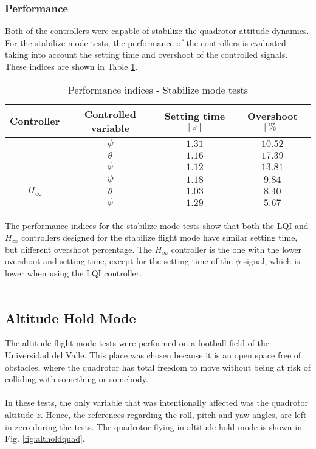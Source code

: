 \subsubsection{Performance}
Both of the controllers were capable of stabilize the quadrotor attitude dynamics. For the stabilize mode tests, the performance of the controllers is evaluated taking into account the setting time and overshoot of the controlled signals. These indices are shown in Table \ref{tb:stabilize_index}.
\begin{table}[H]
\small
\begin{center}
\caption{Performance indices - Stabilize mode tests}\label{tb:stabilize_index}
\begin{tabular}{c|c|c|c}\hline
\rule{0pt}{3ex} Controller & Controlled variable & Setting time $[s]$ & Overshoot $[\%]$ \\\hline\hline
\rule{0pt}{3ex} 
\multirow{3}{*}{LQI} 
 & $\psi$ & $1.31$ & $10.52$ \\
 & $\theta$ & $1.16$ & $17.39$ \\
 & $\phi$ & $1.12$ & $13.81$\\ \hline
\multirow{3}{*}{$H_\infty$} 
 & $\psi$ & $1.18$ & $9.84$ \\
 & $\theta$ & $1.03$ & $8.40$ \\
 & $\phi$ & $1.29$ & $5.67$ \\ \hline\hline
\end{tabular}
\end{center}
\end{table}
The performance indices for the stabilize mode tests show that both the LQI and $H_\infty$ controllers designed for the stabilize flight mode have similar setting time, but different overshoot percentage. The $H_\infty$ controller is the one with the lower overshoot and setting time, except for the setting time of the $\phi$ signal, which is lower when using the LQI controller.
\\\\
\subsection{Altitude Hold Mode}
The altitude flight mode tests were performed on a football field of the Universidad del Valle. This place was chosen because it is an open space free of obstacles, where the quadrotor has total freedom to move without being at risk of colliding with something or somebody.
\\\\
In these tests, the only variable that was intentionally affected was the quadrotor altitude $z$. Hence, the references regarding the roll, pitch and yaw angles, are left in zero during the tests. The quadrotor flying in altitude hold mode is shown in Fig. \ref{fig:altholdquad}.

